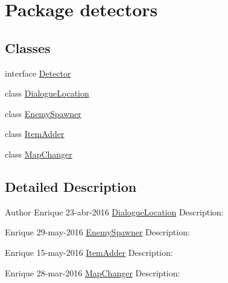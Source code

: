 \hypertarget{namespacedetectors}{}\section{Package detectors}
\label{namespacedetectors}
\subsection*{Classes}
\begin{DoxyCompactItemize}
\item 
interface \mbox{\hyperlink{interfacedetectors_1_1_detector}{Detector}}
\item 
class \mbox{\hyperlink{classdetectors_1_1_dialogue_location}{Dialogue\+Location}}
\item 
class \mbox{\hyperlink{classdetectors_1_1_enemy_spawner}{Enemy\+Spawner}}
\item 
class \mbox{\hyperlink{classdetectors_1_1_item_adder}{Item\+Adder}}
\item 
class \mbox{\hyperlink{classdetectors_1_1_map_changer}{Map\+Changer}}
\end{DoxyCompactItemize}


\subsection{Detailed Description}
\begin{DoxyAuthor}{Author}
Enrique  23-\/abr-\/2016  \mbox{\hyperlink{classdetectors_1_1_dialogue_location}{Dialogue\+Location}} Description\+:

Enrique  29-\/may-\/2016  \mbox{\hyperlink{classdetectors_1_1_enemy_spawner}{Enemy\+Spawner}} Description\+:

Enrique  15-\/may-\/2016  \mbox{\hyperlink{classdetectors_1_1_item_adder}{Item\+Adder}} Description\+:

Enrique  28-\/mar-\/2016  \mbox{\hyperlink{classdetectors_1_1_map_changer}{Map\+Changer}} Description\+: 
\end{DoxyAuthor}
